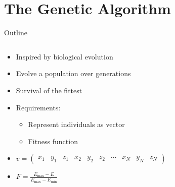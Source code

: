 \documentclass[10pt]{beamer}
\begin{document}
\section{The Genetic Algorithm}

{%
\begin{frame}{Outline}
	\begin{columns}[c] %
		\begin{column}{.48\textwidth}
			\begin{itemize}
				\item {Inspired by biological evolution}
				\item {Evolve a population over generations}
				\item {Survival of the fittest}
				\item {Requirements:}
				\begin{itemize}
					\item {Represent individuals as vector}
					\item {Fitness function}
				\end{itemize}
				\item{$v = \left(\begin{smallmatrix}
					x_1 & y_1 & z_1 & x_2 &  y_2 & z_2 &
					\cdots & x_N & y_N & z_N
					\end{smallmatrix}\right)$}
				\item{$F = \frac{E_{\max} - E}{E_{\max} - E_{\min}}$}
			\end{itemize}


\end{column}
\end{columns}
\end{frame}}
\end{document}
